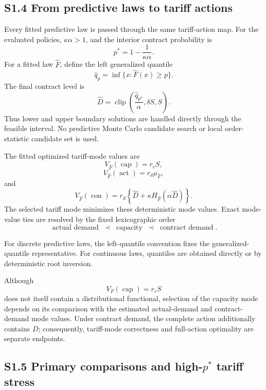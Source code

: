 \documentclass[AMA,Times1COL]{WileyNJDv5}
\begin{document}
\subsection*{S1.4 From predictive laws to tariff actions}

Every fitted predictive law is passed through the same tariff-action
map. For the evaluated policies, \(\kappa\alpha>1\), and the interior
contract probability is
\[
p^\ast
=
1-\frac{1}{\kappa\alpha}.
\]
For a fitted law \(\widehat F\), define the left generalized quantile
\[
\widehat q_p
=
\inf\{x:\widehat F(x)\geq p\}.
\]
The final contract level is
\[
\widehat D
=
\operatorname{clip}
\left(
\frac{\widehat q_{p^\ast}}{\alpha},
\delta S,
S
\right).
\]
Thus lower and upper boundary solutions are handled directly through
the feasible interval. No predictive Monte Carlo candidate search or
local order-statistic candidate set is used.

The fitted optimized tariff-mode values are
\[
V_{\widehat F}(\operatorname{cap})
=
r_cS,
\]
\[
V_{\widehat F}(\operatorname{act})
=
r_d\mu_{\widehat F},
\]
and
\[
V_{\widehat F}(\operatorname{con})
=
r_d
\left\{
\widehat D
+
\kappa
H_{\widehat F}(\alpha\widehat D)
\right\}.
\]
The selected tariff mode minimizes these deterministic mode values.
Exact mode-value ties are resolved by the fixed lexicographic order
\[
\operatorname{actual\ demand}
\;\prec\;
\operatorname{capacity}
\;\prec\;
\operatorname{contract\ demand}.
\]

For discrete predictive laws, the left-quantile convention fixes the
generalized-quantile representative. For continuous laws, quantiles
are obtained directly or by deterministic root inversion.

Although
\[
V_F(\operatorname{cap})=r_cS
\]
does not itself contain a distributional functional, selection of the
capacity mode depends on its comparison with the estimated
actual-demand and contract-demand mode values. Under contract demand,
the complete action additionally contains \(D\); consequently,
tariff-mode correctness and full-action optimality are separate
endpoints.




\subsection*{S1.5 Primary comparisons and high-$p^*$ tariff stress}
\end{document}
